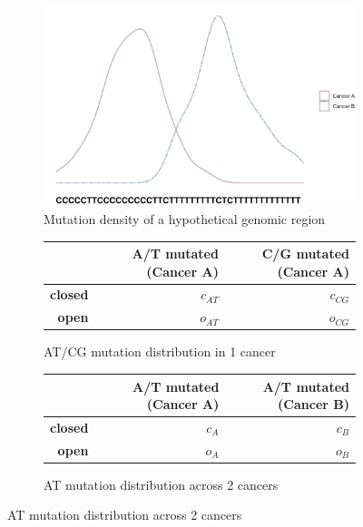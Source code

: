 \begin{figure}[ht!]
  \begin{subfigure}[c]{\textwidth}
    \includegraphics[scale=0.9]{graphics/discussion_gle.pdf}
    \caption{Mutation density of a hypothetical genomic region}
  \end{subfigure}\hfill
  \vspace{1cm}
  
  \begin{subfigure}[c]{0.48\textwidth}
  \centering
    \begin{tabulary}{\columnwidth}{rRR}
    \toprule
        & \textbf{A/T mutated (Cancer A)} &  \textbf{C/G mutated (Cancer A)} \\
    \hline
        \textbf{closed} & $c_{AT}$ &  $c_{CG}$ \\
        \textbf{open} & $o_{AT}$ & $o_{CG}$  \\
    \bottomrule
    \end{tabulary}
    \caption{AT/CG mutation distribution in 1 cancer}
  \end{subfigure}\hfill
  \begin{subfigure}[c]{0.48\textwidth}
    \begin{tabulary}{\columnwidth}{rRR}
    \toprule
        & \textbf{A/T mutated (Cancer A)} &  \textbf{A/T mutated (Cancer B)} \\
    \hline
        \textbf{closed} & $c_{A}$ &  $c_{B}$ \\
        \textbf{open} & $o_{A}$ & $o_{B}$  \\
    \bottomrule
    \end{tabulary}
    \caption{AT mutation distribution across 2 cancers}
  \end{subfigure}
  \vspace{0.8cm}
  

\end{figure}
